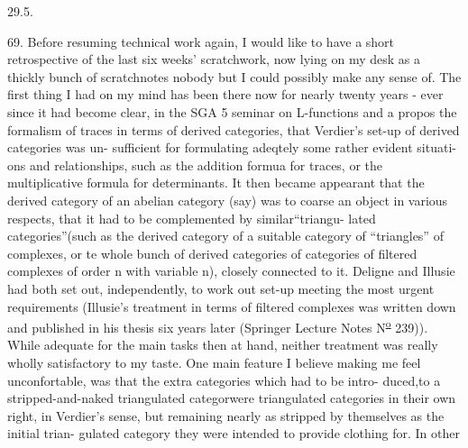 
29.5.

69. Before resuming   technical work again, I would like to have a
short retrospective of the last six weeks' scratchwork, now lying on my
desk as a thickly bunch of scratchnotes\hand{,} nobody but I could possibly make
any sense of. \hand{//}The first thing I had on my mind has been there now for
nearly twenty years - ever since it had become clear, in the SGA 5
seminar on L-functions and a propos the formalism of traces in terms of
derived categories, that Verdier's set-up of derived categories was un-%
sufficient for formulating adeqtely  some rather evident situati-%
ons\unsure{\xout{,}} and relationships, such as the addition formua for traces, or the
multiplicative formula for determinants. It then became appearant that
the derived category of an abelian category (say) was to coarse an object
in various respects, that it had to be complemented by similar``triangu-%
lated categories''(such as the  derived category of a suitable category
of ``triangles'' of complexes, or te whole bunch of derived categories
of categories of filtered complexes of order n with variable n), closely
connected to it. Deligne and Illusie had both set out, independently,
to work out  set-up meeting the most urgent requirements (Illusie's
treatment in terms of filtered complexes was written down and published
in his thesis six years later (Springer Lecture Notes N\textsuperscript{\underline{o}} 239)). While
adequate for the main tasks then at hand, neither treatment was really
wholly satisfactory to my taste. One main feature I believe making me
feel unconfortable, was that the extra categories which had to be intro-%
duced,to   a stripped-and-naked triangulated categor\hand{,}were
triangulated categories in their own right, in Verdier's sense, but
remaining nearly as stripped  by themselves as the initial trian-%
gulated category they were intended to provide clothing for. In other
